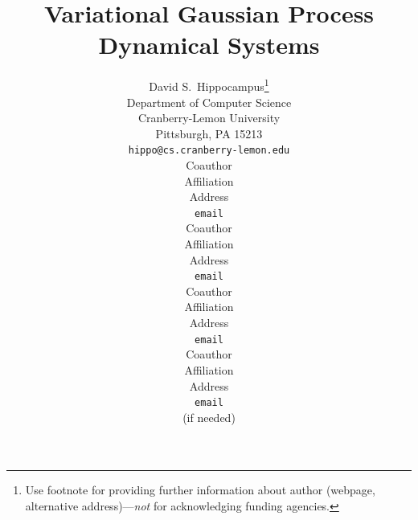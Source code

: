 \documentclass{article} %
\title{Variational Gaussian Process Dynamical Systems}
\author{
David S.~Hippocampus\thanks{ Use footnote for providing further information
about author (webpage, alternative address)---\emph{not} for acknowledging
funding agencies.} \\
Department of Computer Science\\
Cranberry-Lemon University\\
Pittsburgh, PA 15213 \\
\texttt{hippo@cs.cranberry-lemon.edu} \\
\And
Coauthor \\
Affiliation \\
Address \\
\texttt{email} \\
\AND
Coauthor \\
Affiliation \\
Address \\
\texttt{email} \\
\And
Coauthor \\
Affiliation \\
Address \\
\texttt{email} \\
\And
Coauthor \\
Affiliation \\
Address \\
\texttt{email} \\
(if needed)\\
}
\begin{document}
\newcommand{\highlight}[1]{\colorbox{yellow}{#1}}

\newcommand{\bff}{\mathbf{f}}
\newcommand{\bfu}{\mathbf{u}}
\newcommand{\bfy}{\mathbf{y}}
\newcommand{\bfx}{\mathbf{x}}
\newcommand{\bft}{\mathbf{t}}
\newcommand{\bfk}{\mathbf{k}}
\newcommand{\bfmu}{\boldsymbol \mu}
\newcommand{\bfz}{\mathbf{0}}

\newcommand{\T}{{\top}}

\newcommand{\bfa}{\mathbf{a}}
\newcommand{\bb}{\beta^{-1}}
\newcommand{\la}{\left\langle}
\newcommand{\ra}{\right\rangle}
\newcommand{\vv}{\vartheta}



\maketitle
\end{document}
